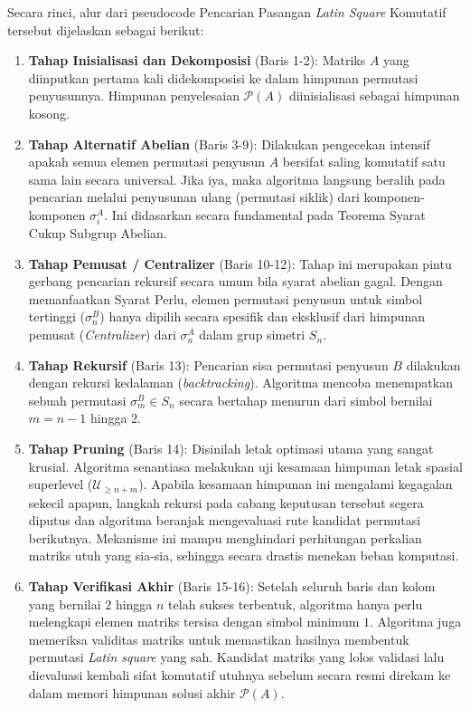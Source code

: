 \documentclass[journal]{IEEEtran}
\theoremstyle{definition}
\theoremstyle{plain}
\begin{document}
Secara rinci, alur dari pseudocode Pencarian Pasangan \textit{Latin Square} Komutatif tersebut dijelaskan sebagai berikut:
\begin{enumerate}
    \item \textbf{Tahap Inisialisasi dan Dekomposisi} (Baris 1-2): Matriks $A$ yang diinputkan pertama kali didekomposisi ke dalam himpunan permutasi penyusunnya. Himpunan penyelesaian $\mathcal{P}(A)$ diinisialisasi sebagai himpunan kosong.
    \item \textbf{Tahap Alternatif Abelian} (Baris 3-9): Dilakukan pengecekan intensif apakah semua elemen permutasi penyusun $A$ bersifat saling komutatif satu sama lain secara universal. Jika iya, maka algoritma langsung beralih pada pencarian melalui penyusunan ulang (permutasi siklik) dari komponen-komponen $\sigma_i^A$. Ini didasarkan secara fundamental pada Teorema Syarat Cukup Subgrup Abelian.
    \item \textbf{Tahap Pemusat / Centralizer} (Baris 10-12): Tahap ini merupakan pintu gerbang pencarian rekursif secara umum bila syarat abelian gagal. Dengan memanfaatkan Syarat Perlu, elemen permutasi penyusun untuk simbol tertinggi ($\sigma_n^B$) hanya dipilih secara spesifik dan eksklusif dari himpunan pemusat (\textit{Centralizer}) dari $\sigma_n^A$ dalam grup simetri $S_n$.
    \item \textbf{Tahap Rekursif} (Baris 13): Pencarian sisa permutasi penyusun $B$ dilakukan dengan rekursi kedalaman (\textit{backtracking}). Algoritma mencoba menempatkan sebuah permutasi $\sigma_m^B \in S_n$ secara bertahap menurun dari simbol bernilai $m=n-1$ hingga $2$.
    \item \textbf{Tahap Pruning} (Baris 14): Disinilah letak optimasi utama yang sangat krusial. Algoritma senantiasa melakukan uji kesamaan himpunan letak spasial superlevel ($\mathcal{U}_{\ge n+m}$). Apabila kesamaan himpunan ini mengalami kegagalan sekecil apapun, langkah rekursi pada cabang keputusan tersebut segera diputus dan algoritma beranjak mengevaluasi rute kandidat permutasi berikutnya. Mekanisme ini mampu menghindari perhitungan perkalian matriks utuh yang sia-sia, sehingga secara drastis menekan beban komputasi.
    \item \textbf{Tahap Verifikasi Akhir} (Baris 15-16): Setelah seluruh baris dan kolom yang bernilai $2$ hingga $n$ telah sukses terbentuk, algoritma hanya perlu melengkapi elemen matriks tersisa dengan simbol minimum $1$. Algoritma juga memeriksa validitas matriks untuk memastikan hasilnya membentuk permutasi \textit{Latin square} yang sah. Kandidat matriks yang lolos validasi lalu dievaluasi kembali sifat komutatif utuhnya sebelum secara resmi direkam ke dalam memori himpunan solusi akhir $\mathcal{P}(A)$.
\end{enumerate}
\end{document}
